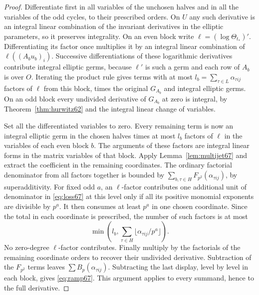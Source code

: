 \documentclass[a4paper,11pt]{article}
\theoremstyle{definition}
\theoremstyle{remark}
\numberwithin{equation}{section}
\begin{document}
\begin{proof}
Differentiate first in all variables of the unchosen halves
and in all the variables of the odd cycles, to their prescribed
orders. On \(U\) any such derivative is an integral linear
combination of the invariant derivatives in the elliptic
parameters, so it preserves integrality. On an even block write
\(\ell=(\log\Theta_{t_*})'\). Differentiating its factor once
multiplies it by an integral linear combination of
\(\ell((A_bu_b)_i)\). Successive differentiations of these
logarithmic derivatives contribute integral elliptic germs,
because \(\ell'\) is such a germ and each row of \(A_b\) is over
\(O\). Iterating the product rule gives terms with at most
\(l_b=\sum_{\tau\in L}\alpha_{\tau ij}\) factors of \(\ell\)
from this block, times the original \(G_{A_b}\) and integral
elliptic germs. On an odd block every undivided derivative of
\(G_{A_b}\) at zero is integral, by Theorem~\ref{thm:hurwitz62}
and the integral linear change of variables.

Set all the differentiated variables to zero. Every remaining
term is now an integral elliptic germ in the chosen halves
times at most \(l_b\) factors of \(\ell\) in the variables of
each even block \(b\). The arguments of these factors are
integral linear forms in the matrix variables of that block.
Apply Lemma~\ref{lem:multijet67} and extract the coefficient
in the remaining coordinates. The ordinary factorial denominator
from all factors together is bounded by
\(\sum_{b,\tau\in H}F_{p^2}(\alpha_{\tau ij})\), by superadditivity.
For fixed odd \(a\), an \(\ell\)-factor contributes one additional
unit of denominator in \eqref{eq:loss67} at this level only if
all its positive monomial exponents are divisible by \(p^a\).
It then consumes at least \(p^a\) in one chosen coordinate. Since
the total in each coordinate is prescribed, the number of such
factors is at most
\[
       \min\left(l_b,\sum_{\tau\in H}
                             \lfloor\alpha_{\tau ij}/p^a\rfloor\right).
\]
No zero-degree \(\ell\)-factor contributes. Finally multiply by
the factorials of the remaining coordinate orders to recover
their undivided derivative. Subtraction of the \(F_{p^2}\) terms
leaves \(\sum B_p(\alpha_{\tau ij})\). Subtracting the last
display, level by level in each block, gives \eqref{eq:ramp67}.
This argument applies to every summand, hence to the full derivative.
\end{proof}
\end{document}
